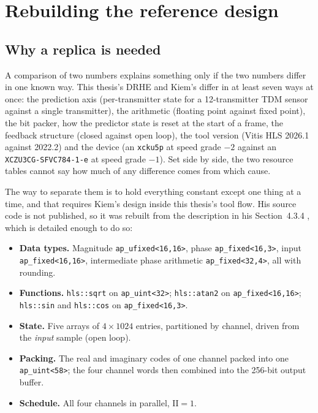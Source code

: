 \section{Rebuilding the reference design}
\label{sec:hw_replica}

\subsection{Why a replica is needed}

A comparison of two numbers explains something only if the two numbers differ
in one known way. This thesis's DRHE and Kiem's differ in at least seven ways
at once: the prediction axis (per-transmitter state for a 12-transmitter TDM
sensor against a single transmitter), the arithmetic (floating point against
fixed point), the bit packer, how the predictor state is reset at the start of
a frame, the feedback structure (closed against open loop), the tool version
(Vitis HLS 2026.1 against 2022.2) and the device (an \texttt{xcku5p} at speed
grade $-2$ against an \texttt{XCZU3CG-SFVC784-1-e} at speed grade $-1$). Set
side by side, the two resource tables cannot say how much of any difference
comes from which cause.

The way to separate them is to hold everything constant except one thing at a
time, and that requires Kiem's design inside this thesis's tool flow. His source
code is not published, so it was rebuilt from the description in his
Section~4.3.4 \cite{kiem2025}, which is detailed enough to do so:

\begingroup\sloppy
\begin{itemize}
\item \textbf{Data types.} Magnitude \texttt{ap\_ufixed<16,16>}, phase
\texttt{ap\_fixed<16,3>}, input \texttt{ap\_fixed<16,16>}, intermediate phase
arithmetic \texttt{ap\_fixed<32,4>}, all with rounding.
\item \textbf{Functions.} \texttt{hls::sqrt} on \texttt{ap\_uint<32>};
\texttt{hls::atan2} on \texttt{ap\_fixed<16,16>}; \texttt{hls::sin} and
\texttt{hls::cos} on \texttt{ap\_fixed<16,3>}.
\item \textbf{State.} Five arrays of $4 \times 1024$ entries, partitioned by
channel, driven from the \emph{input} sample (open loop).
\item \textbf{Packing.} The real and imaginary codes of one channel packed
into one \texttt{ap\_uint<58>}; the four channel words then combined into the
256-bit output buffer.
\item \textbf{Schedule.} All four channels in parallel, $\mathrm{II} = 1$.
\end{itemize}
\endgroup

